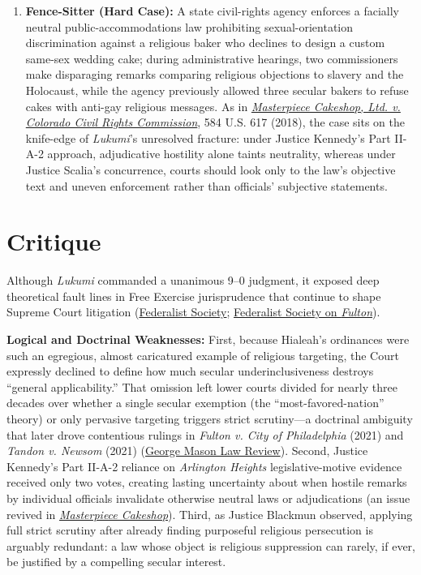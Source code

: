 \documentclass[12pt]{article}
\begin{document}
\begin{enumerate}
  \item \textbf{Fence-Sitter (Hard Case):} A state civil-rights agency enforces a facially neutral public-accommodations law prohibiting sexual-orientation discrimination against a religious baker who declines to design a custom same-sex wedding cake; during administrative hearings, two commissioners make disparaging remarks comparing religious objections to slavery and the Holocaust, while the agency previously allowed three secular bakers to refuse cakes with anti-gay religious messages. As in \href{https://supreme.justia.com/cases/federal/us/584/16-111/}{\textit{Masterpiece Cakeshop, Ltd. v. Colorado Civil Rights Commission}}, 584 U.S. 617 (2018), the case sits on the knife-edge of \textit{Lukumi}'s unresolved fracture: under Justice Kennedy's Part II-A-2 approach, adjudicative hostility alone taints neutrality, whereas under Justice Scalia's concurrence, courts should look only to the law's objective text and uneven enforcement rather than officials' subjective statements.
\end{enumerate}

\section{Critique}

Although \textit{Lukumi} commanded a unanimous 9--0 judgment, it exposed deep theoretical fault lines in Free Exercise jurisprudence that continue to shape Supreme Court litigation (\href{https://fedsoc.org/case/church-of-the-lukumi-babalu-aye-inc-v-city-of-hialeah}{Federalist Society}; \href{https://fedsoc.org/case/fulton-v-city-of-philadelphia}{Federalist Society on \textit{Fulton}}).

\textbf{Logical and Doctrinal Weaknesses:} First, because Hialeah's ordinances were such an egregious, almost caricatured example of religious targeting, the Court expressly declined to define how much secular underinclusiveness destroys ``general applicability.'' That omission left lower courts divided for nearly three decades over whether a single secular exemption (the ``most-favored-nation'' theory) or only pervasive targeting triggers strict scrutiny---a doctrinal ambiguity that later drove contentious rulings in \textit{Fulton v. City of Philadelphia} (2021) and \textit{Tandon v. Newsom} (2021) (\href{https://lawreview.gmu.edu/print__issues/religious-and-secular-comparators/}{George Mason Law Review}). Second, Justice Kennedy's Part II-A-2 reliance on \textit{Arlington Heights} legislative-motive evidence received only two votes, creating lasting uncertainty about when hostile remarks by individual officials invalidate otherwise neutral laws or adjudications (an issue revived in \href{https://supreme.justia.com/cases/federal/us/584/16-111/}{\textit{Masterpiece Cakeshop}}). Third, as Justice Blackmun observed, applying full strict scrutiny after already finding purposeful religious persecution is arguably redundant: a law whose object is religious suppression can rarely, if ever, be justified by a compelling secular interest.
\end{document}
